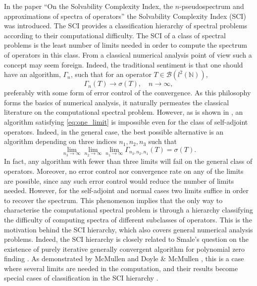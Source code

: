 \documentclass[a4paper,10pt]{article}
\begin{document}
In the paper ``On the Solvability Complexity Index, the $n$-pseudospectrum and approximations of spectra of operators'' \cite{hansen2011} the Solvability Complexity Index (SCI) was introduced. The SCI provides a classification hierarchy \cite{hansen2011,SCI, CRAS,colbrook4,colbrook3,colbrook2019computing,colbrook2020pseudoergodic} of spectral problems according to their computational difficulty. The SCI of a class of spectral problems is the least number of limits needed in order to compute the spectrum of operators in this class. From a classical numerical analysis point of view such a concept may seem foreign. Indeed, the traditional sentiment is that one should have an algorithm, $\Gamma_n$, such that for an operator $T \in \mathcal{B}(l^2(\mathbb{N}))$,
\begin{equation}\label{eq:one_limit}
\Gamma_n(T) \longrightarrow \sigma(T), \quad n \rightarrow \infty,
\end{equation}
preferably with some form of error control of the convergence. As this philosophy forms the basics of numerical analysis, it naturally permeates the classical literature on the computational spectral problem. However, as is shown in \cite{hansen2011,SCI, CRAS}, an algorithm satisfying \eqref{eq:one_limit} is impossible even for the class of self-adjoint operators. Indeed, in the general case, the best possible alternative is an algorithm depending on three indices $n_1, n_2, n_3$ such that 
  \begin{equation*}
\lim_{n_3 \rightarrow \infty} \lim_{n_2 \rightarrow \infty} \lim_{n_1 \rightarrow \infty} \Gamma_{n_3,n_2,n_1}(T) = \sigma(T).
\end{equation*}
In fact, any algorithm with fewer than three limits will fail on the general class of operators. Moreover, no error control nor convergence rate on any of the limits are possible, since any such error control would reduce the number of limits needed. However, for the self-adjoint and normal cases two limits suffice in order to recover the spectrum. This phenomenon implies that the only way to characterise the computational spectral problem is through a hierarchy classifying the difficulty of computing spectra of different subclasses of operators. This is the motivation behind the SCI hierarchy, which also covers general numerical analysis problems. Indeed, the SCI hierarchy is closely related to Smale's question on the existence of purely iterative generally convergent algorithm for polynomial zero
finding \cite{Smale2}. As demonstrated by McMullen \cite{McMullen1, McMullen2} and Doyle \& McMullen \cite{Doyle_McMullen}, this is a case where several limits are needed in the computation, and their results become special cases of classification in the SCI hierarchy \cite{SCI, CRAS}.  
\end{document}
